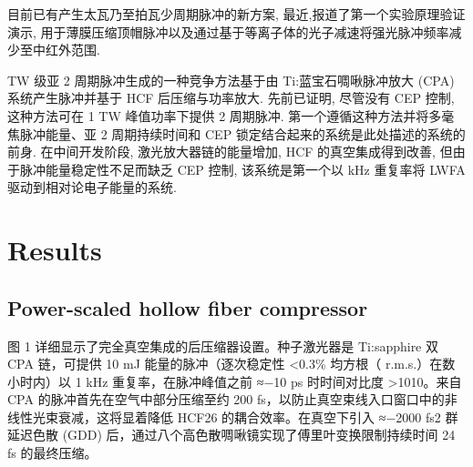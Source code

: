 \documentclass[14pt,a4paper,oneside]{article}
\numberwithin{equation}{subsection}             %
\numberwithin{figure}{subsection}               %
\begin{document}
目前已有产生太瓦乃至拍瓦少周期脉冲的新方案, 最近,报道了第一个实验原理验证演示, 用于薄膜压缩顶帽脉冲\cite{farinellaFocusabilityLaserPulses2019}以及通过基于等离子体的光子减速将强光脉冲频率减少至中红外范围\cite{zhuSinglecycleTerawattTwistedlight2019}. 

TW 级亚 2 周期脉冲生成的一种竞争方法基于由 Ti:蓝宝石啁啾脉冲放大 (CPA) 系统产生脉冲并基于 HCF 后压缩与功率放大\cite{vozziOptimalSpectralBroadening2005}. 先前已证明, 尽管没有 CEP 控制, 这种方法可在 1 TW 峰值功率下提供 2 周期脉冲. 第一个遵循这种方法并将多毫焦脉冲能量、亚 2 周期持续时间和 CEP 锁定结合起来的系统\cite{bohmanGeneration50Fs2010}是此处描述的系统的前身. 在中间开发阶段, 激光放大器链的能量增加, HCF 的真空集成得到改善, 但由于脉冲能量稳定性不足而缺乏 CEP 控制, 该系统是第一个以 kHz 重复率将 LWFA 驱动到相对论电子能量的系统\cite{guenotRelativisticElectronBeams2017}. 

\section{Results}

\subsection{Power-scaled hollow ﬁber compressor}

图 1 详细显示了完全真空集成的后压缩器设置。种子激光器是 Ti:sapphire 双 CPA 链，可提供 10 mJ 能量的脉冲（逐次稳定性 <0.3\% 均方根（ r.m.s.）在数小时内）以 1 kHz 重复率，在脉冲峰值之前 ≈−10 ps 时时间对比度 >1010。来自 CPA 的脉冲首先在空气中部分压缩至约 200 fs，以防止真空束线入口窗口中的非线性光束衰减，这将显着降低 HCF26 的耦合效率。在真空下引入 ≈−2000 fs2 群延迟色散 (GDD) 后，通过八个高色散啁啾镜实现了傅里叶变换限制持续时间 24 fs 的最终压缩。




\newpage

\clearpage           %
{}      %
{}   %


\end{document}
